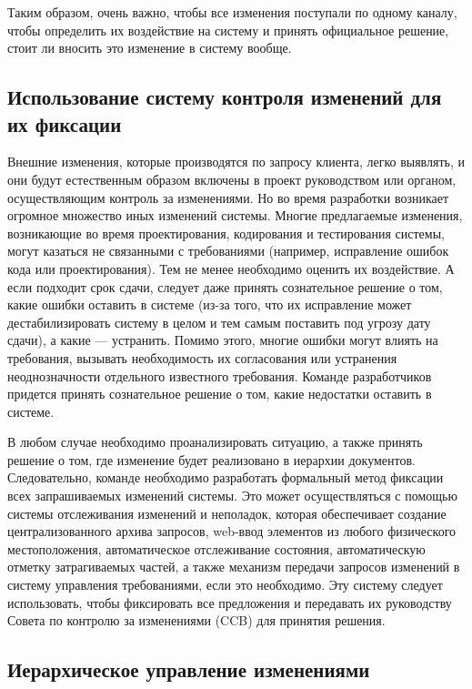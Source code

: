\documentclass[a4paper,14pt]{extarticle}
\begin{document}
Таким образом, очень важно, чтобы все изменения поступали по одному каналу,
чтобы определить их воздействие на систему и принять официальное решение, стоит
ли вносить это изменение в систему вообще.

\subsection{Использование систему контроля изменений для их фиксации}

Внешние изменения, которые производятся по запросу клиента, легко выявлять, и
они будут естественным образом включены в проект руководством или органом,
осуществляющим контроль за изменениями. Но во время разработки возникает
огромное множество иных изменений системы. Многие предлагаемые изменения,
возникающие во время проектирования, кодирования и тестирования системы, могут
казаться не связанными с требованиями (например, исправление ошибок кода или
проектирования). Тем не менее необходимо оценить их воздействие. А если подходит
срок сдачи, следует даже принять сознательное решение о том, какие ошибки
оставить в системе (из-за того, что их исправление может дестабилизировать
систему в целом и тем самым поставить под угрозу дату сдачи), а какие —
устранить. Помимо этого, многие ошибки могут влиять на требования, вызывать
необходимость их согласования или устранения неоднозначности отдельного
известного требования. Команде разработчиков придется принять сознательное
решение о том, какие недостатки оставить в системе.

В любом случае необходимо проанализировать ситуацию, а также принять решение о
том, где изменение будет реализовано в иерархии документов. Следовательно,
команде необходимо разработать формальный метод фиксации всех запрашиваемых
изменений системы. Это может осуществляться с помощью системы отслеживания
изменений и неполадок, которая обеспечивает создание централизованного архива
запросов, web-ввод элементов из любого физического местоположения,
автоматическое отслеживание состояния, автоматическую отметку затрагиваемых
частей, а также механизм передачи запросов изменений в систему управления
требованиями, если это необходимо. Эту систему следует использовать, чтобы
фиксировать все предложения и передавать их руководству Совета по контролю за
изменениями (CCB) для принятия решения.

\subsection{Иерархическое управление изменениями}
\end{document}
